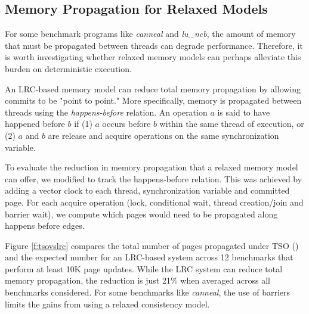 \subsection{Memory Propagation for Relaxed Models}

For some benchmark programs like {\it canneal} and {\it lu\_ncb}, the amount of memory that must be propagated between threads can degrade \lib{} performance. Therefore, it is worth investigating whether relaxed memory models can perhaps alleviate this burden on deterministic execution.

An LRC-based memory model can reduce total memory propagation by allowing commits to be "point to point." More specifically, memory is propagated between threads using the \emph{happens-before} relation. An operation $a$ is said to have happened before $b$ if (1) $a$ occurs before $b$ within the same thread of execution, or (2) $a$ and $b$ are release and acquire operations on the same synchronization variable. 

To evaluate the reduction in memory propagation that a relaxed memory model can offer, we modified \lib{} to track the happens-before relation. This was achieved by adding a vector clock to each thread, synchronization variable and committed page. For each acquire operation (lock, conditional wait, thread creation/join and barrier wait)\cite{kai_lu_efficient_2014}, we compute which pages would need to be propagated along happens before edges.

Figure \ref{f:tsovslrc} compares the total number of pages propagated under TSO (\lib{}) and the expected number for an LRC-based system across 12 benchmarks that perform at least 10K page updates. While the LRC system can reduce total memory propagation, the reduction is just 21\% when averaged across all benchmarks considered. For some benchmarks like {\it canneal}, the use of barriers limits the gains from using a relaxed consistency model.

